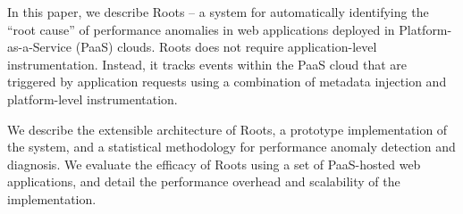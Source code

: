 In this paper, we describe Roots -- a system for automatically identifying the
``root cause'' of performance anomalies in web applications deployed
in Platform-as-a-Service (PaaS) clouds.
Roots does not require
application-level instrumentation.  Instead, it tracks events within the PaaS
cloud that are triggered by application requests using a
combination of metadata injection and platform-level instrumentation.

We describe the extensible architecture of Roots, a prototype implementation 
of the system, and a statistical methodology for performance anomaly
detection and diagnosis.  We evaluate the efficacy of Roots
using a set of PaaS-hosted web applications, and detail the performance
overhead and scalability of the implementation.

